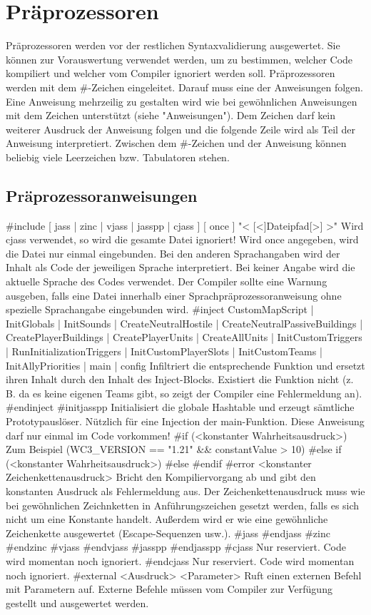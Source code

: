 \chapter{Präprozessoren}
Präprozessoren werden vor der restlichen Syntaxvalidierung ausgewertet.
Sie können zur Vorauswertung verwendet werden, um zu bestimmen, welcher Code kompiliert und welcher vom Compiler ignoriert werden soll.
Präprozessoren werden mit dem #-Zeichen eingeleitet. Darauf muss eine der Anweisungen folgen.
Eine Anweisung mehrzeilig zu gestalten wird wie bei gewöhnlichen Anweisungen mit dem \-Zeichen unterstützt (siehe "Anweisungen").
Dem \-Zeichen darf kein weiterer Ausdruck der Anweisung folgen und die folgende Zeile wird als Teil der Anweisung interpretiert.
Zwischen dem #-Zeichen und der Anweisung können beliebig viele Leerzeichen bzw. Tabulatoren stehen.

\section{Präprozessoranweisungen}
#include [ jass | zinc | vjass | jasspp | cjass ] [ once ] "< [<]Dateipfad[>] >" Wird cjass verwendet, so wird die gesamte Datei ignoriert! Wird once angegeben, wird die Datei nur einmal eingebunden. Bei den anderen Sprachangaben wird der Inhalt als Code der jeweiligen Sprache interpretiert. Bei keiner Angabe wird die aktuelle Sprache des Codes verwendet. Der Compiler sollte eine Warnung ausgeben, falls eine Datei innerhalb einer Sprachpräprozessoranweisung ohne spezielle Sprachangabe eingebunden wird.
#inject CustomMapScript | InitGlobals | InitSounds | CreateNeutralHostile | CreateNeutralPassiveBuildings | CreatePlayerBuildings | CreatePlayerUnits | CreateAllUnits | InitCustomTriggers | RunInitializationTriggers | InitCustomPlayerSlots | InitCustomTeams | InitAllyPriorities | main | config                Infiltriert die entsprechende Funktion und ersetzt ihren Inhalt durch den Inhalt des Inject-Blocks. Existiert die Funktion nicht (z. B. da es keine eigenen Teams gibt, so zeigt der Compiler eine Fehlermeldung an).
#endinject
#initjasspp                                       Initialisiert die globale Hashtable und erzeugt sämtliche Prototypauslöser. Nützlich für eine Injection der main-Funktion. Diese Anweisung darf nur einmal im Code vorkommen!
#if (<konstanter Wahrheitsausdruck>)              Zum Beispiel (WC3_VERSION == "1.21" && constantValue > 10)
#else if (<konstanter Wahrheitsausdruck>)
#else
#endif
#error <konstanter Zeichenkettenausdruck>         Bricht den Kompiliervorgang ab und gibt den konstanten Ausdruck als Fehlermeldung aus. Der Zeichenkettenausdruck muss wie bei gewöhnlichen Zeichnketten in Anführungszeichen gesetzt werden, falls es sich nicht um eine Konstante handelt. Außerdem wird er wie eine gewöhnliche Zeichenkette ausgewertet (Escape-Sequenzen usw.).
#jass
#endjass
#zinc
#endzinc
#vjass
#endvjass
#jasspp
#endjasspp
#cjass                                            Nur reserviert. Code wird momentan noch ignoriert.
#endcjass                                         Nur reserviert. Code wird momentan noch ignoriert.
#external <Ausdruck> <Parameter>                  Ruft einen externen Befehl mit Parametern auf. Externe Befehle müssen vom Compiler zur Verfügung gestellt und ausgewertet werden.

